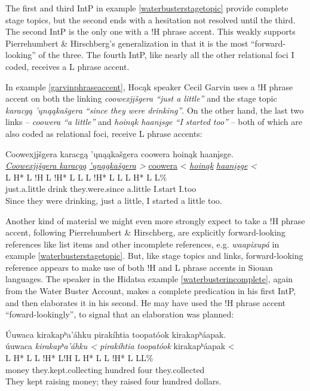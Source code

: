 \documentclass[output=paper]{LSP/langsci}
\begin{document}
The first and third IntP in example \ref{waterbusterstagetopic} provide complete stage topics, but the second ends with a hesitation not resolved until the third. The second IntP is the only one with a !H phrase accent. This weakly supports Pierrehumbert \& Hirschberg’s generalization in that it is the most “forward-looking” of the three. The fourth IntP, like nearly all the other relational foci I coded, receives a L phrase accent.

In example \ref{garvinphraseaccent}, Hocąk speaker Cecil Garvin uses a !H phrase accent on both the linking \emph{coowexjįšgera “just a little”} and the stage topic \emph{karacgą ’ųnąąkašgera “since they were drinking”}. On the other hand, the last two links -- \emph{coowera “a little”} and \emph{hoinąk	haanįsge “I started too”} -- both of which are also coded as relational foci, receive L phrase accents:

\ea\label{garvinphraseaccent}
 	Coowexjįšgera karacgą ’ųnąąkašgera coowera hoinąk haanįsge.\footnotemark\\
\glll	\emph{\underline{Coowexjįšgera	}}	\emph{\underline{karacgą}}	\emph{\underline{’ųnąąkašgera}	>}	{\underline{coowera} <}	\emph{\underline{hoinąk}}	\emph{\underline{haanįsge} <}\\
	{\ob L H* L !H\cb}				{\ob L !H* L}				{L\cb}	{\ob L !H* L L\cb}		{\ob L H* L}						{\hspaceThis{haanįs}\ob\hspaceThis{ }L\%}\\
	just.a.little					drink					they.were.since				a.little				I.start						I.too\\
\glt	Since they were drinking, just a little, I started a little too.
\z

Another kind of material we might even more strongly expect to take a !H phrase accent, following Pierrehumbert \& Hirschberg, are explicitly forward-looking references like list items and other incomplete references, e.g. \emph{waapixupá} in example \ref{waterbusterstagetopic}. But, like stage topics and links, forward-looking reference appears to make use of both !H and L phrase accents in Siouan languages. The speaker in the Hidatsa example \ref{waterbusterincomplete}, again from the Water Buster Account, makes a complete predication in his first IntP, and then elaborates it in his second. He may have used the !H phrase accent “foward-lookingly”, to signal that an elaboration was planned:

\ea\label{waterbusterincomplete}
 	Úuwaca kirakapʰa’áhku pirakíhtia toopatóok kirakapʰáapak.\footnotemark\\
\glll	úuwaca	\emph{kirakapʰa’áhku <}		\emph{pirakíhtia}	\emph{toopatóok}	{kirakapʰáapak <}\\
	{\ob L H* L}	{L !H* L!H\cb}	{\ob L H* L}		{}			{L !H* L L\cb{}L\%}\\
	money	they.kept.collecting			hundred		four			they.collected\\
\glt	They kept raising money; they raised four hundred dollars.
\z
\end{document}
